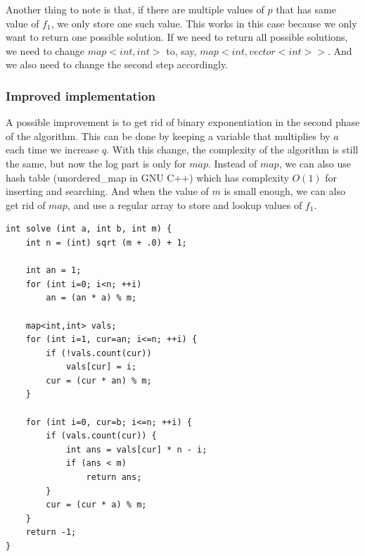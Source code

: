 \documentclass[8pt, a4paper, oneside, twocolumn]{extarticle}
\begin{document}
Another thing to note is that, if there are multiple values of $p$ that has same value of $f_1$, we only store one such value. This works in this case because we only want to return one possible solution. If we need to return all possible solutions, we need to change $map<int,int>$ to, say, $map<int, vector<int>>$. And we also need to change the second step accordingly.
\subsubsection{Improved implementation}

A possible improvement is to get rid of binary exponentiation in the second phase of the algorithm. This can be done by keeping a variable that multiplies by $a$ each time we increase $q$. With this change, the complexity of the algorithm is still the same, but now the log part is only for $map$. Instead of $map$, we can also use hash table (unordered\_{}map in GNU C++) which has complexity $O(1)$ for inserting and searching. And when the value of $m$ is small enough, we can also get rid of $map$, and use a regular array to store and lookup values of $f_1$.
\begin{verbatim}
int solve (int a, int b, int m) {
	int n = (int) sqrt (m + .0) + 1;
 
	int an = 1;
	for (int i=0; i<n; ++i)
		an = (an * a) % m;
 
	map<int,int> vals;
	for (int i=1, cur=an; i<=n; ++i) {
		if (!vals.count(cur))
			vals[cur] = i;
		cur = (cur * an) % m;
	}
 
	for (int i=0, cur=b; i<=n; ++i) {
		if (vals.count(cur)) {
			int ans = vals[cur] * n - i;
			if (ans < m)
				return ans;
		}
		cur = (cur * a) % m;
	}
	return -1;
}
\end{verbatim}
\end{document}
